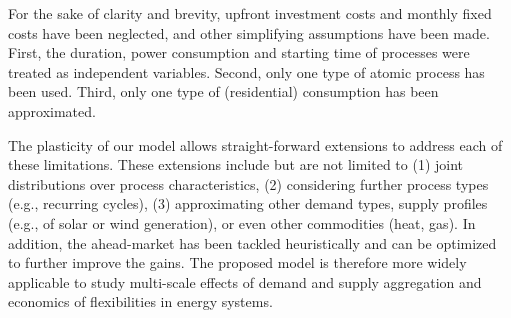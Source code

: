 \documentclass[conference]{IEEEtran}
\begin{document}
For the sake of clarity and brevity, upfront investment costs and monthly fixed costs have been neglected, and other simplifying assumptions have been made. First, the duration, power consumption and starting time of processes were treated as independent variables. Second, only one type of atomic process has been used. Third, only one type of (residential) consumption has been approximated. 


The plasticity of our model allows straight-forward extensions to address each of these limitations. These extensions include but are not limited to (1) joint distributions over process characteristics, (2) considering further process types (e.g., recurring cycles), (3) approximating other demand types, supply profiles (e.g., of solar or wind generation), or even other commodities (heat, gas). In addition, the ahead-market has been tackled heuristically and can be optimized to further improve the gains. %
The proposed model is therefore more widely applicable to study multi-scale effects of demand and supply aggregation and economics of flexibilities in energy systems.



\balance

\end{document}
